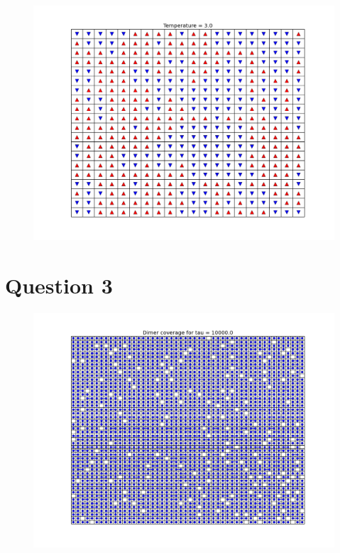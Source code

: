\documentclass[a4paper,12pt]{article}
\begin{document}
\begin{figure}[H]
\centering
\includegraphics[width = \linewidth]{lab11q2_3.png}
\caption{}
\label{fig:q2_3}
\end{figure}


\section{Question 3}

\begin{figure}[H]
\centering
\includegraphics[width = \linewidth]{lab11q3_1e4.png}
\caption{}
\label{fig:q3_4}
\end{figure}
\end{document}
